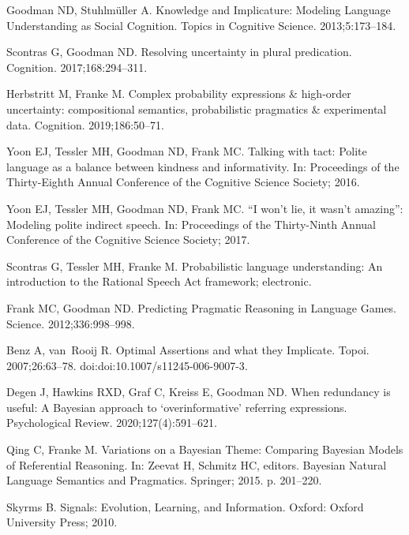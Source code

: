 \documentclass[10pt,letterpaper]{article}
\begin{document}
\begin{thebibliography}{10}
Goodman ND, Stuhlm\"{u}ller A.
\newblock Knowledge and Implicature: Modeling Language Understanding as Social
  Cognition.
\newblock Topics in Cognitive Science. 2013;5:173--184.

Scontras G, Goodman ND.
\newblock Resolving uncertainty in plural predication.
\newblock Cognition. 2017;168:294--311.

Herbstritt M, Franke M.
\newblock Complex probability expressions \& high-order uncertainty:
  compositional semantics, probabilistic pragmatics \& experimental data.
\newblock Cognition. 2019;186:50--71.

Yoon EJ, Tessler MH, Goodman ND, Frank MC.
\newblock Talking with tact: Polite language as a balance between kindness and
  informativity.
\newblock In: Proceedings of the Thirty-Eighth Annual Conference of the
  {C}ognitive {S}cience {S}ociety; 2016.

Yoon EJ, Tessler MH, Goodman ND, Frank MC.
\newblock ``I won't lie, it wasn't amazing'': Modeling polite indirect speech.
\newblock In: Proceedings of the Thirty-Ninth Annual Conference of the
  {C}ognitive {S}cience {S}ociety; 2017.

Scontras G, Tessler MH, Franke M.
\newblock Probabilistic language understanding: An introduction to the
  {R}ational {S}peech {A}ct framework; electronic.

Frank MC, Goodman ND.
\newblock Predicting Pragmatic Reasoning in Language Games.
\newblock Science. 2012;336:998--998.

Benz A, van~Rooij R.
\newblock Optimal Assertions and what they Implicate.
\newblock Topoi. 2007;26:63--78.
\newblock doi:{doi:10.1007/s11245-006-9007-3}.

Degen J, Hawkins RXD, Graf C, Kreiss E, Goodman ND.
\newblock When redundancy is useful: A {B}ayesian approach to `overinformative'
  referring expressions.
\newblock Psychological Review. 2020;127(4):591--621.

Qing C, Franke M.
\newblock Variations on a {B}ayesian Theme: Comparing {B}ayesian Models of
  Referential Reasoning.
\newblock In: Zeevat H, Schmitz HC, editors. Bayesian Natural Language
  Semantics and Pragmatics. Springer; 2015. p. 201--220.

Skyrms B.
\newblock Signals: {E}volution, Learning, and Information.
\newblock Oxford: Oxford University Press; 2010.


\end{thebibliography}
\end{document}
